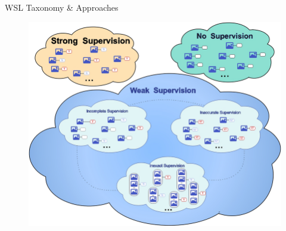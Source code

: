 \begin{frame}[allowframebreaks]{WSL Taxonomy & Approaches}
    \begin{figure}
        \centering
        \includegraphics[width=\linewidth,height=0.9\textheight,keepaspectratio]{images/contrastive/weak-supervised.png}
    \end{figure}


\end{frame}
